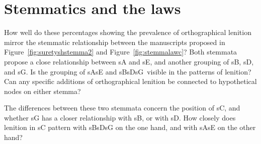 \section{Stemmatics and the laws}
\label{sec:stemmatics-laws}


How well do these percentages showing the prevalence of orthographical lenition mirror the stemmatic relationship between the manuscripts proposed in Figure~\ref{fig:suretyshstemma2} and Figure~\ref{fig:stemmalawc}? Both stemmata propose a close relationship between \gls{sA} and \gls{sE}, and another grouping of \gls{sB}, \gls{sD}, and \gls{sG}. Is the grouping of \gls{sA}\gls{sE} and \gls{sB}\gls{sD}\gls{sG}\ visible in the patterns of lenition? Can any specific additions of orthographical lenition be connected to hypothetical nodes on either stemma?

The differences between these two stemmata concern the position of \gls{sC}, and whether \gls{sG} has a closer relationship with \gls{sB}, or with \gls{sD}. How closely does lenition in \gls{sC} pattern with \gls{sB}\gls{sD}\gls{sG} on the one hand, and with \gls{sA}\gls{sE} on the other hand?  


